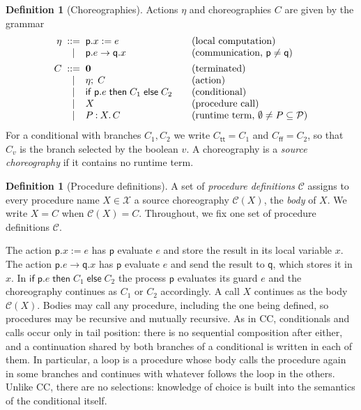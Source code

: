 \documentclass[11pt]{article}
\theoremstyle{plain}
\theoremstyle{definition}
\newtheorem{definition}[theorem]{Definition}
\theoremstyle{remark}
\newcommand{\kw}[1]{\mathsf{#1}}
\newcommand{\kif}{\kw{if}\;}
\newcommand{\kthen}{\;\kw{then}\;}
\newcommand{\kelse}{\;\kw{else}\;}
\newcommand{\nil}{\mathbf{0}}
\newcommand{\ttrue}{\mathsf{tt}}
\newcommand{\ffalse}{\mathsf{ff}}
\newcommand{\seq}{;\;}
\newcommand{\pp}{\mathsf{p}}
\newcommand{\qq}{\mathsf{q}}
\newcommand{\Procs}{\mathcal{P}}
\newcommand{\ifcond}[3]{\kif #1 \kthen #2 \kelse #3}
\newcommand{\Pnames}{\mathcal{X}}
\newcommand{\Defs}{\mathcal{C}}
\newcommand{\body}[1]{\Defs(#1)}
\newcommand{\rt}[3]{#1\mathbin{:}#2.\,#3}
\begin{document}
\begin{definition}[Choreographies]\label{def:chor-syntax}
  Actions $\eta$ and choreographies $C$ are given by the grammar
  \[
  \begin{array}{r@{\;\;}c@{\;\;}l@{\qquad}l}
    \eta & ::= & \pp.x := e & \text{(local computation)}\\
         & \mid & \pp.e \to \qq.x & \text{(communication, $\pp \neq \qq$)}\\[1ex]
    C & ::= & \nil & \text{(terminated)}\\
      & \mid & \eta \seq C & \text{(action)}\\
      & \mid & \ifcond{\pp.e}{C_1}{C_2} & \text{(conditional)}\\
      & \mid & X & \text{(procedure call)}\\
      & \mid & \rt{P}{X}{C} & \text{(runtime term, $\emptyset \neq P \subseteq \Procs$)}
  \end{array}
  \]
  For a conditional with branches $C_1, C_2$ we write $C_\ttrue = C_1$ and
  $C_\ffalse = C_2$, so that $C_v$ is the branch selected by the boolean $v$.
  A choreography is a \emph{source choreography} if it contains no runtime
  term.
\end{definition}

\begin{definition}[Procedure definitions]\label{def:defs}
  A set of \emph{procedure definitions} $\Defs$ assigns to every procedure
  name $X\in\Pnames$ a source choreography $\body{X}$, the \emph{body} of $X$.
  We write $X = C$ when $\body{X} = C$.  Throughout, we fix one set of
  procedure definitions $\Defs$.
\end{definition}

The action $\pp.x := e$ has $\pp$ evaluate $e$ and store the result in its
local variable $x$.  The action $\pp.e \to \qq.x$ has $\pp$ evaluate $e$ and
send the result to $\qq$, which stores it in $x$.  In
$\ifcond{\pp.e}{C_1}{C_2}$ the process $\pp$ evaluates its guard $e$ and the
choreography continues as $C_1$ or $C_2$ accordingly.  A call $X$ continues
as the body $\body{X}$.  Bodies may call any procedure, including the one
being defined, so procedures may be recursive and mutually recursive.  As in
CC, conditionals and calls occur only in tail position: there is no
sequential composition after either, and a continuation shared by both
branches of a conditional is written in each of them.  In particular, a loop
is a procedure whose body calls the procedure again in some branches and
continues with whatever follows the loop in the others.  Unlike CC, there are
no selections: knowledge of choice is built into the semantics of the
conditional itself.
\end{document}
